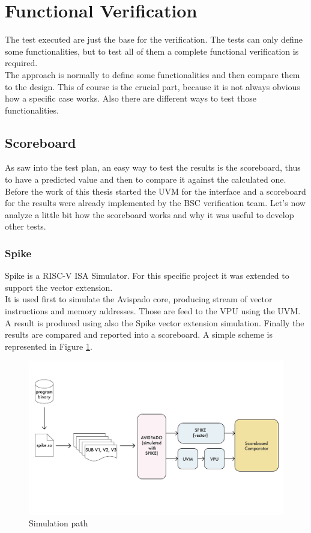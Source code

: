 \section{Functional Verification}
The test executed are just the base for the verification. The tests can only define some functionalities, but to test all of them a complete functional verification is required.\\


The approach is normally to define some functionalities and then compare them to the design. This of course is the crucial part, because it is not always obvious how a specific case works. Also there are different ways to test those functionalities.\\

\subsection{Scoreboard}
As saw into the test plan, an easy way to test the results is the scoreboard, thus to have a predicted value and then to compare it against the calculated one.\\

Before the work of this thesis started the UVM for the interface and a scoreboard for the results were already implemented by the BSC verification team. Let's now analyze a little bit how the scoreboard works and why it was useful to develop other tests.

\subsubsection{Spike}
Spike is a RISC-V ISA Simulator. For this specific project it was extended to support the vector extension.\\
It is used first to simulate the Avispado core, producing stream of vector instructions and memory addresses. Those are feed to the VPU using the UVM. A result is produced using also the Spike vector extension simulation. Finally the results are compared and reported into a scoreboard. A simple scheme is represented in Figure \ref{bin-to-log}. \\

\begin{figure}[H]
    \centering
    \includegraphics[scale = 0.6]{Chapter_2/img/bin-to-log.png}
    \caption{Simulation path}
    \label{bin-to-log}
\end{figure}

